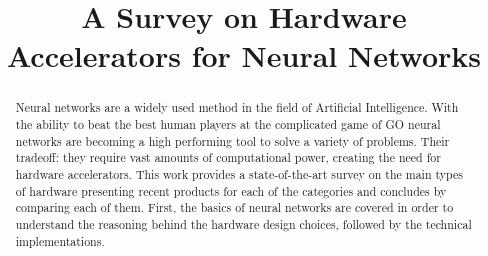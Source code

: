 \documentclass[conference]{IEEEtran}
\begin{document}
	\title{A Survey on Hardware Accelerators for Neural Networks}
	\author{
	}
	
	\maketitle
	
	\begin{abstract}
		Neural networks are a widely used method in the field of Artificial Intelligence. With the ability to beat the best human players at the complicated game of GO \cite{chouard2016go} neural networks are becoming a high performing tool to solve a variety of problems. Their tradeoff: they require vast amounts of computational power, creating the need for hardware accelerators. This work provides a state-of-the-art survey on the main types of hardware presenting recent products for each of the categories and concludes by comparing each of them. First, the basics of neural networks are covered in order to understand the reasoning behind the hardware design choices, followed by the technical implementations.
		\\
	\end{abstract}
	
\end{document}
